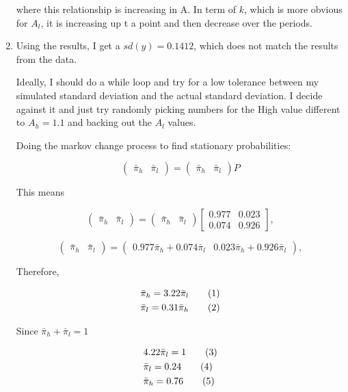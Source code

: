 \documentclass[12pt]{article}%
\newcommand\numberthis{\addtocounter{equation}{1}\tag{\theequation}}
\begin{document}
\begin{enumerate}
	where this relationship is increasing in A. In term of $k$, which is more obvious for $A_l$, it is increasing up t a point and then decrease over the periods. 

	
	\item Using the results, I get a $sd(y)= 0.1412$, which does not match the results from the data. 
	
		 Ideally, I should do a while loop and try for a low tolerance between my simulated standard deviation and the actual standard deviation. I decide against it and just try randomly picking numbers for the High value different to $A_h=1.1$ and backing out the $A_l$ values.	 	
	
	Doing the markov change process to find stationary probabilities:
	
		\[
	\begin{pmatrix}\bar{\pi}_{h} & \bar{\pi}_{l}\end{pmatrix}=\begin{pmatrix}\bar{\pi}_{h} & \bar{\pi}_{l}\end{pmatrix}P
	\]
	
	This means
	
	\[
	\begin{pmatrix}\bar{\pi}_{h} & \bar{\pi}_{l}\end{pmatrix}=\begin{pmatrix}\bar{\pi}_{h} & \bar{\pi}_{l}\end{pmatrix}\left[\begin{array}{cc}
	0.977 & 0.023\\
	0.074 & 0.926
	\end{array}\right],
	\]
	
			\[
	\begin{pmatrix}\bar{\pi}_{h} & \bar{\pi}_{l}\end{pmatrix}=\begin{pmatrix} 0.977\bar{\pi}_{h}+ 0.074\bar{\pi}_{l} & 	0.023\bar{\pi}_{h}+0.926\bar{\pi}_{l}\end{pmatrix},
	\]
	
		Therefore,
	
	\begin{align*}
	&\bar{\pi}_{h}=  3.22 \bar{\pi}_{l}  \numberthis \\
	&\bar{\pi}_{l}=  0.31 \bar{\pi}_{h} \numberthis \\	
	\end{align*}
	
		Since $\bar{\pi}_{h}+\bar{\pi}_{l}=1$
	
	\begin{align*}
	&4.22\bar{\pi}_{l}= 1 \numberthis \\
	&\bar{\pi}_{l}= 0.24  \numberthis \\
	&\bar{\pi}_{h}=  0.76   \numberthis \\	
	\end{align*}
	

\end{enumerate}
\end{document}
